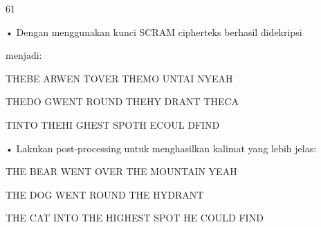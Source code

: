 \documentclass{article}
\begin{document}

61

• Dengan menggunakan kunci SCRAM cipherteks berhasil didekripsi 

menjadi:

  THEBE ARWEN TOVER THEMO UNTAI NYEAH

  THEDO GWENT ROUND THEHY DRANT THECA

  TINTO THEHI GHEST SPOTH ECOUL DFIND

• Lakukan post-processing untuk menghasilkan kalimat yang lebih jelas:

 THE BEAR WENT OVER THE MOUNTAIN YEAH

 THE DOG WENT ROUND THE HYDRANT 

 THE CAT INTO THE HIGHEST SPOT HE COULD FIND
\end{document}
